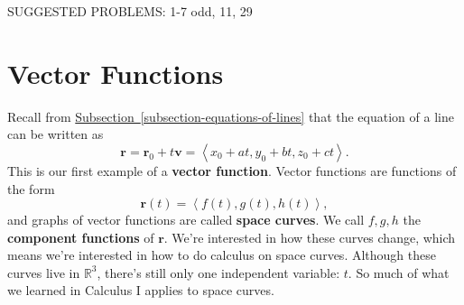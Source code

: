 \documentclass[10pt,]{book}
\newcommand{\terminology}[1]{\textbf{#1}}
\theoremstyle{ptxplainnotitle}
\theoremstyle{ptxplaintitle}
\theoremstyle{ptxplainnotitle}
\theoremstyle{ptxplaintitle}
\theoremstyle{ptxplainnotitle}
\theoremstyle{ptxplaintitle}
\theoremstyle{ptxdefinitionnotitle}
\theoremstyle{ptxdefinitiontitle}
\theoremstyle{ptxdefinitionnotitle}
\theoremstyle{ptxdefinitiontitle}
\theoremstyle{ptxdefinitionnotitle}
\theoremstyle{ptxdefinitiontitle}
\theoremstyle{ptxdefinitionnotitle}
\theoremstyle{ptxdefinitiontitle}
\theoremstyle{ptxdefinitionnotitle}
\theoremstyle{ptxdefinitiontitle}
\numberwithin{equation}{section}
\newcommand{\RR}{\mathbb{R}}
\newcommand{\vv}[1]{\mathbf{#1}}
\newcommand{\dotprod}[1]{\left\langle #1 \right\rangle}
\begin{document}
\hypertarget{p-906}{}%
SUGGESTED PROBLEMS: 1-7 odd, 11, 29%
\typeout{************************************************}
\typeout{************************************************}
\section[{Vector Functions}]{Vector Functions}\label{section-vector-functions}
\hypertarget{p-907}{}%
Recall from \hyperref[subsection-equations-of-lines]{Subsection~\ref{subsection-equations-of-lines}} that the equation of a line can be written as%
\begin{equation*}
\vv{r} = \vv{r}_{0}+t\vv{v} = \dotprod{x_{0}+at, y_{0}+bt, z_{0}+ct}.
\end{equation*}
This is our first example of a \terminology{vector function}. Vector functions are functions of the form%
\begin{equation*}
\vv{r}(t) = \dotprod{f(t),g(t),h(t)},
\end{equation*}
and graphs of vector functions are called \terminology{space curves}. We call \(f,g,h\) the \terminology{component functions} of \(\vv{r}\). We're interested in how these curves change, which means we're interested in how to do calculus on space curves. Although these curves live in \(\RR^{3}\), there's still only one independent variable: \(t\). So much of what we learned in Calculus I applies to space curves.%
\typeout{************************************************}
\typeout{************************************************}
\end{document}
